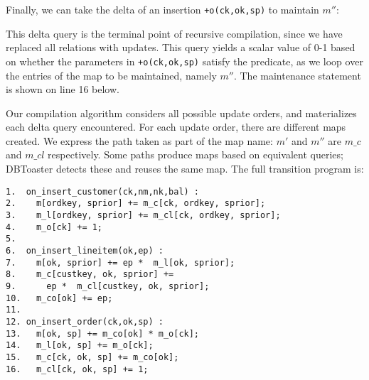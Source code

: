 {\noindent Finally, we can take the delta of an insertion {\tt +o(ck,ok,sp)} to
maintain $m''$:


\noindent This delta query is the terminal point of recursive compilation, since
we have replaced all relations with updates. This query yields a scalar value of
0-1 based on whether the parameters in {\tt +o(ck,ok,sp)} satisfy the predicate,
as we loop over the entries of the map to be maintained, namely $m''$. The
maintenance statement is shown on line 16 below.


\noindent Our compilation algorithm considers all possible update orders, and
materializes each delta query encountered.  For each update order, there are different maps created.  We express the path taken as part of the map name: $m'$ and $m''$ are $m\_c$ and $m\_cl$ respectively.  Some paths produce maps based on equivalent queries; DBToaster detects these and reuses the same map.  The full transition program is:
}

{\footnotesize
\begin{verbatim}
1.  on_insert_customer(ck,nm,nk,bal) :
2.    m[ordkey, sprior] += m_c[ck, ordkey, sprior];
3.    m_l[ordkey, sprior] += m_cl[ck, ordkey, sprior];
4.    m_o[ck] += 1;
5. 
6.  on_insert_lineitem(ok,ep) :
7.    m[ok, sprior] += ep *  m_l[ok, sprior];
8.    m_c[custkey, ok, sprior] +=
9.      ep *  m_cl[custkey, ok, sprior];
10.   m_co[ok] += ep;
11.
12. on_insert_order(ck,ok,sp) :
13.   m[ok, sp] += m_co[ok] * m_o[ck]; 
14.   m_l[ok, sp] += m_o[ck];
15.   m_c[ck, ok, sp] += m_co[ok];
16.   m_cl[ck, ok, sp] += 1;
\end{verbatim}
}

